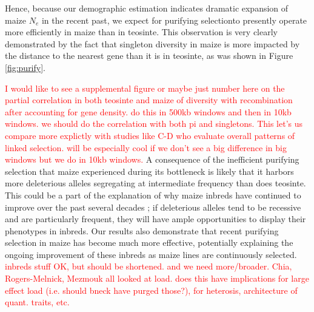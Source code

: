 \documentclass{pnastwo}
\newcommand{\jri}[1]{\textcolor{red}{\scriptsize #1}}
\begin{document}
\begin{article}
{Hence, because our demographic estimation indicates dramatic expansion of maize $N_e$ in the recent past, we expect for purifying selectionto presently operate more efficiently in maize than in teosinte. This observation is very clearly demonstrated by the fact that singleton diversity in maize is more impacted by the distance to the nearest gene than it is in teosinte, as was shown in Figure \ref{fig:purify}. }\DIFdelend \DIFaddbegin {}\DIFaddend 

\DIFaddbegin \jri{I would like to see a supplemental figure or maybe just number here on the partial correlation in both teosinte and maize of diversity with recombination after accounting for gene density.  do this in 500kb windows and then in 10kb windows.  we should do the correlation with both pi and singletons.  This let's us compare more explictly with studies like C-D who evaluate overall patterns of linked selection. will be especially cool if we don't see a big difference in big windows but we do in 10kb windows.  }
\DIFaddend A consequence of the inefficient purifying selection that maize experienced during its bottleneck is likely that it harbors more \DIFaddbegin {}\DIFaddend deleterious alleles segregating at intermediate frequency than does teosinte. This could be a part of the explanation of why maize inbreds have continued to improve over the past several decades \cite{meghji1984}; if deleterious alleles tend to be recessive and are particularly frequent, they will have ample opportunities to display their phenotypes in inbreds. Our results also demonstrate that recent purifying selection in maize has become much more effective, potentially explaining the ongoing improvement of these inbreds as maize lines are continuously selected. \DIFdelbegin \DIFdelend \DIFaddbegin {}\jri{inbreds stuff OK, but should be shortened.  and we need more/broader. Chia, Rogers-Melnick, Mezmouk all looked at load. does this have implications for large effect load (i.e. should bneck have purged those?), for heterosis, architecture of quant. traits, etc.}
\DIFaddend 


\end{article}
\end{document}
